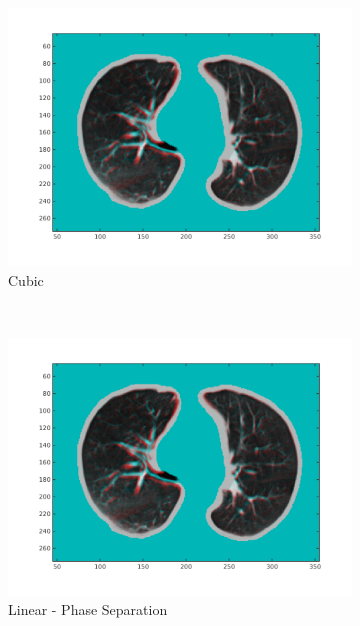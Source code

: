 \documentclass[11pt,a4paper,oneside]{report}
\begin{document}
\begin{figure}[H]
\begin{subfigure}[b]{0.33\textwidth}
    \includegraphics[width=\textwidth, trim=0 50 0 0,clip=true]{figures/task4/visAss_m3.png}
    \caption{Cubic}
  \end{subfigure}
  ~
  \hspace*{-2em}
  \begin{subfigure}[b]{0.33\textwidth}
    \includegraphics[width=\textwidth, trim=0 50 0 0,clip=true]{figures/task4/visAss_m4.png}
    \caption{Linear - Phase Separation}
  \end{subfigure}%
  \begin{subfigure}[b]{0.33\textwidth}

\end{subfigure}
\end{figure}
\end{document}
